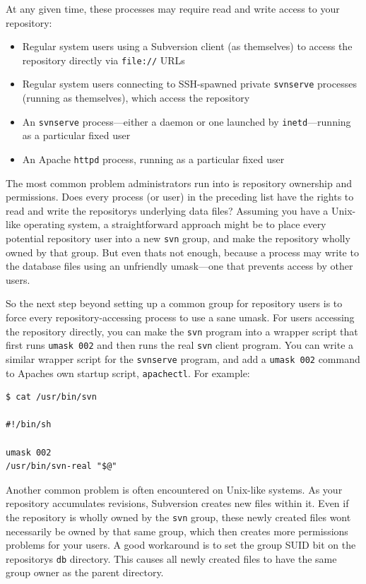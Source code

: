 At any given time, these processes may require read and write access to
your repository:

\begin{itemize}
\item
  Regular system users using a Subversion client (as themselves) to
  access the repository directly via \texttt{file://} URLs
\item
  Regular system users connecting to SSH-spawned private
  \texttt{svnserve} processes (running as themselves), which access the
  repository
\item
  An \texttt{svnserve} process---either a daemon or one launched by
  \texttt{inetd}---running as a particular fixed user
\item
  An Apache \texttt{httpd} process, running as a particular fixed user
\end{itemize}

The most common problem administrators run into is repository ownership
and permissions. Does every process (or user) in the preceding list have
the rights to read and write the repository\textquotesingle s underlying
data files? Assuming you have a Unix-like operating system, a
straightforward approach might be to place every potential repository
user into a new \texttt{svn} group, and make the repository wholly owned
by that group. But even that\textquotesingle s not enough, because a
process may write to the database files using an unfriendly umask---one
that prevents access by other users.

So the next step beyond setting up a common group for repository users
is to force every repository-accessing process to use a sane umask. For
users accessing the repository directly, you can make the \texttt{svn}
program into a wrapper script that first runs \texttt{umask\ 002} and
then runs the real \texttt{svn} client program. You can write a similar
wrapper script for the \texttt{svnserve} program, and add a
\texttt{umask\ 002} command to Apache\textquotesingle s own startup
script, \texttt{apachectl}. For example:

\begin{verbatim}
$ cat /usr/bin/svn

#!/bin/sh

umask 002
/usr/bin/svn-real "$@"
\end{verbatim}

Another common problem is often encountered on Unix-like systems. As
your repository accumulates revisions, Subversion creates new files
within it. Even if the repository is wholly owned by the \texttt{svn}
group, these newly created files won\textquotesingle t necessarily be
owned by that same group, which then creates more permissions problems
for your users. A good workaround is to set the group SUID bit on the
repository\textquotesingle s \texttt{db} directory. This causes all
newly created files to have the same group owner as the parent
directory.

